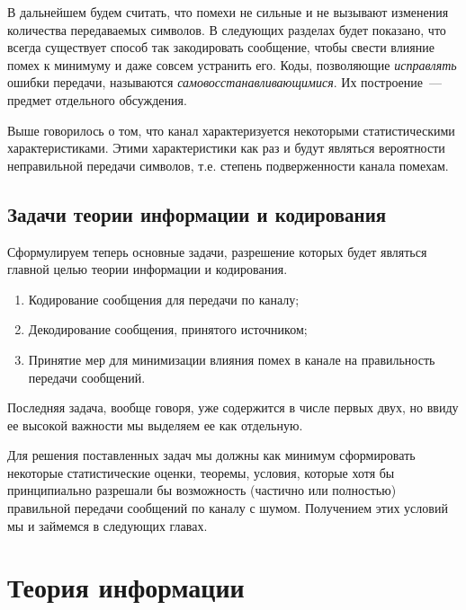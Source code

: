\documentclass[12pt,a4paper,openright]{book}
\theoremstyle{definition}
\numberwithin{equation}{chapter}
\begin{document}
	В дальнейшем будем считать, что помехи не сильные и не вызывают изменения количества передаваемых символов. В следующих разделах будет показано, что всегда существует способ так закодировать сообщение, чтобы свести влияние помех к минимуму и даже совсем устранить его. Коды, позволяющие \textit{исправлять} ошибки передачи, называются \textit{самовосстанавливающимися}. Их построение~--- предмет отдельного обсуждения.

	Выше говорилось о том, что канал характеризуется некоторыми статистическими характеристиками. Этими характеристики как раз и будут являться вероятности неправильной передачи символов, т.е. степень подверженности канала помехам.









	\section{Задачи теории информации и кодирования}

	Сформулируем теперь основные задачи, разрешение которых будет являться главной целью теории информации и кодирования.

	\begin{enumerate}
		\item Кодирование сообщения для передачи по каналу;
		\item Декодирование сообщения, принятого источником;
		\item Принятие мер для минимизации влияния помех в канале на правильность передачи сообщений.
	\end{enumerate}

	Последняя задача, вообще говоря, уже содержится в числе первых двух, но ввиду ее высокой важности мы выделяем ее как отдельную.

	Для решения поставленных задач мы должны как минимум сформировать некоторые статистические оценки, теоремы, условия, которые хотя бы принципиально разрешали бы возможность (частично или полностью) правильной передачи сообщений по каналу с шумом. Получением этих условий мы и займемся в следующих главах.











	\chapter{Теория информации}
\end{document}
